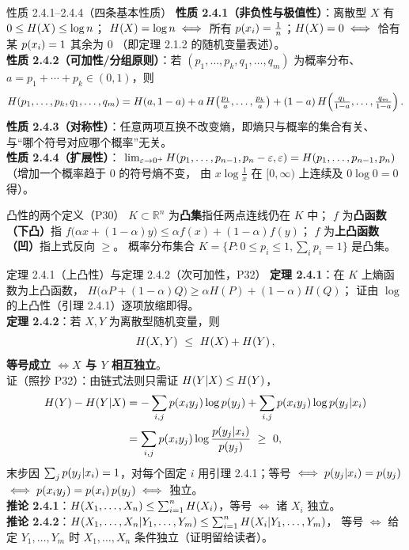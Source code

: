 \begin{thmbox}{性质 2.4.1--2.4.4（四条基本性质）}
\textbf{性质 2.4.1（非负性与极值性）}：离散型 $X$ 有 $0\le H\!\left(X\right)\le\log n$；
$H\!\left(X\right)=\log n\iff$ 所有 $p\!\left(x_i\right)=\frac1n$；$H\!\left(X\right)=0\iff$ 恰有某 $p\!\left(x_i\right)=1$ 其余为 $0$
（即定理 2.1.2 的随机变量表述）。\\[2pt]
\textbf{性质 2.4.2（可加性/分组原则）}：若 $(p_1,\dots,p_k,q_1,\dots,q_m)$ 为概率分布、
$a=p_1+\cdots+p_k\in(0,1)$，则
\begin{align*}
H\!\left(p_1,\dots,p_k,q_1,\dots,q_m\right)
=H\!\left(a,1-a\right)
+a\,H\!\left(\tfrac{p_1}{a},\dots,\tfrac{p_k}{a}\right)
+(1-a)\,H\!\left(\tfrac{q_1}{1-a},\dots,\tfrac{q_m}{1-a}\right) .
\end{align*}
\textbf{性质 2.4.3（对称性）}：任意两项互换不改变熵，即熵只与概率的集合有关、
与“哪个符号对应哪个概率”无关。\\[2pt]
\textbf{性质 2.4.4（扩展性）}：
$\lim_{\varepsilon\to0^{+}}H\!\left(p_1,\dots,p_{n-1},p_n-\varepsilon,\varepsilon\right)
=H\!\left(p_1,\dots,p_{n-1},p_n\right)$（增加一个概率趋于 $0$ 的符号熵不变，
由 $x\log\frac1x$ 在 $[0,\infty)$ 上连续及 $0\log0=0$ 得）。
\end{thmbox}

\begin{keypoint}{凸性的两个定义（P30）}
$K\subset\mathbb{R}^n$ 为\textbf{凸集}指任两点连线仍在 $K$ 中；
$f$ 为\textbf{凸函数（下凸）}指 $f\bigl(\alpha x+(1-\alpha)y\bigr)\le\alpha f(x)+(1-\alpha)f(y)$；
$f$ 为\textbf{上凸函数（凹）}指上式反向 $\ge$。
概率分布集合 $K=\bigl\{P:0\le p_i\le1,\sum_i p_i=1\bigr\}$ 是凸集。
\end{keypoint}

\begin{thmbox}{定理 2.4.1（上凸性）与定理 2.4.2（次可加性，P32）}
\textbf{定理 2.4.1}：在 $K$ 上熵函数为上凸函数，
$H\bigl(\alpha P+(1-\alpha)Q\bigr)\ge\alpha H(P)+(1-\alpha)H(Q)$；
证由 $\log$ 的上凸性（引理 2.4.1）逐项放缩即得。\\[2pt]
\textbf{定理 2.4.2}：若 $X,Y$ 为离散型随机变量，则
\[
\Hx{X,Y}\ \le\ \Hx{X}+\Hx{Y},
\]
\textbf{等号成立 $\iff X$ 与 $Y$ 相互独立}。\\
证（照抄 P32）：由链式法则只需证 $H\!\left(Y|X\right)\le H\!\left(Y\right)$，
\begin{align*}
\Hx{Y}-\Hx{Y|X}
&=-\sum_{i,j}\p{x_iy_j}\log\p{y_j}+\sum_{i,j}\p{x_iy_j}\log\p{y_j|x_i}\\
&=\sum_{i,j}\p{x_iy_j}\log\frac{\p{y_j|x_i}}{\p{y_j}}\ \ge\ 0,
\end{align*}
末步因 $\sum_jp\!\left(y_j|x_i\right)=1$，对每个固定 $i$ 用引理 2.4.1；等号 $\iff p\!\left(y_j|x_i\right)=p\!\left(y_j\right)$
$\iff p\!\left(x_iy_j\right)=p\!\left(x_i\right)p\!\left(y_j\right)\iff$ 独立。\\[2pt]
\textbf{推论 2.4.1}：$H\!\left(X_1,\dots,X_n\right)\le\sum_{i=1}^{n}H\!\left(X_i\right)$，等号 $\iff$ 诸 $X_i$ 独立。\\
\textbf{推论 2.4.2}：$H\!\left(X_1,\dots,X_n|Y_1,\dots,Y_m\right)\le\sum_{i=1}^{n}H\!\left(X_i|Y_1,\dots,Y_m\right)$，
等号 $\iff$ 给定 $Y_1,\dots,Y_m$ 时 $X_1,\dots,X_n$ 条件独立（证明留给读者）。
\end{thmbox}

